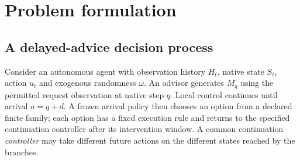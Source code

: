 \section{Problem formulation}\label{sec:formulation}
\subsection{A delayed-advice decision process}
Consider an autonomous agent with observation history $H_t$, native state $S_t$, action $u_t$ and exogenous randomness $\omega$. An advisor generates $M_q$ using the permitted request observation at native step $q$. Local control continues until arrival $a=q+d$. A frozen arrival policy then chooses an option from a declared finite family; each option has a fixed execution rule and returns to the specified continuation controller after its intervention window. A common continuation \emph{controller} may take different future actions on the different states reached by the branches.

